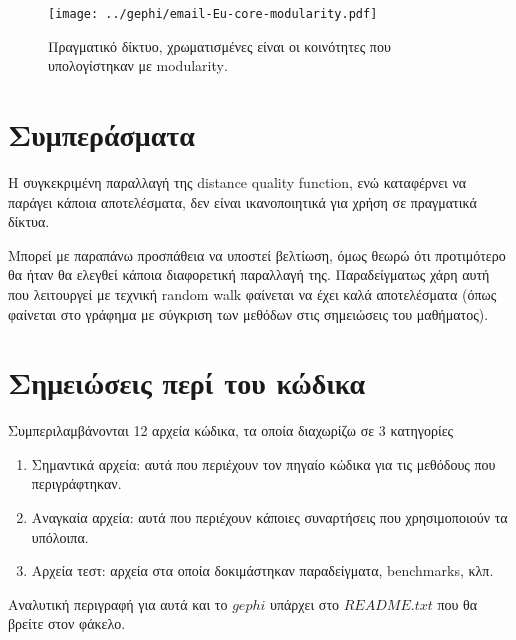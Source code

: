 \documentclass[12pt, letterpaper]{article}
\begin{document}
\begin{figure}
  \centering
  \texttt{[image: ../gephi/email-Eu-core-modularity.pdf]}
  \caption{Πραγματικό δίκτυο, χρωματισμένες είναι οι κοινότητες που υπολογίστηκαν με \textlatin{modularity}.}
  \label{Eu-modularity}
\end{figure}




\section{Συμπεράσματα}


Η συγκεκριμένη παραλλαγή της \textlatin{distance quality function}, ενώ καταφέρνει να 
παράγει κάποια αποτελέσματα, δεν είναι ικανοποιητικά για χρήση σε πραγματικά δίκτυα. 


Μπορεί με παραπάνω προσπάθεια να υποστεί βελτίωση, όμως θεωρώ 
ότι προτιμότερο θα ήταν θα ελεγθεί κάποια διαφορετική παραλλαγή της. Παραδείγματως χάρη 
αυτή που λειτουργεί με τεχνική \textlatin{random walk} φαίνεται να έχει καλά αποτελέσματα 
(όπως φαίνεται στο γράφημα με σύγκριση των μεθόδων στις σημειώσεις του μαθήματος).




\section{Σημειώσεις περί του κώδικα}

Συμπεριλαμβάνονται 12 αρχεία κώδικα, τα οποία διαχωρίζω σε 3 κατηγορίες 

\begin{enumerate}
  \item Σημαντικά αρχεία: αυτά που περιέχουν τον πηγαίο κώδικα για τις μεθόδους που περιγράφτηκαν.
  \item Αναγκαία αρχεία: αυτά που περιέχουν κάποιες συναρτήσεις που χρησιμοποιούν τα υπόλοιπα.
  \item Αρχεία τεστ: αρχεία στα οποία δοκιμάστηκαν παραδείγματα, \textlatin{benchmarks}, κλπ.
\end{enumerate}

Αναλυτική περιγραφή για αυτά και το $gephi$ υπάρχει στο $README.txt$ που θα βρείτε στον φάκελο.



\renewcommand{\refname}{\selectlanguage{greek} Αναφορές}  


\end{document}
